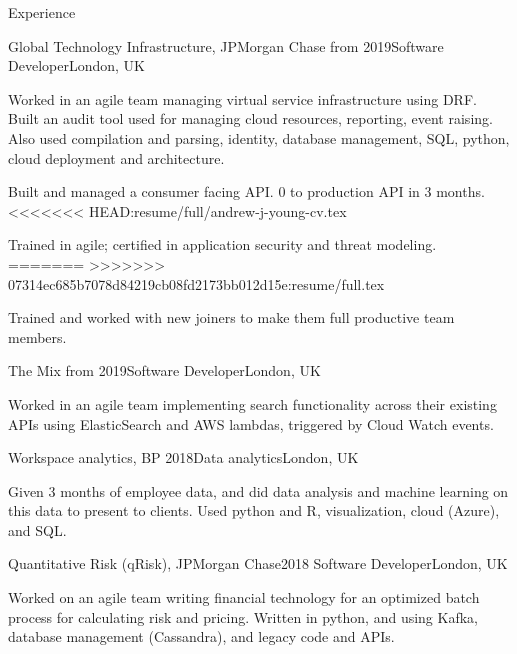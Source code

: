 \documentclass[10pt]{resume} %
\begin{document}
\begin{rSection}{Experience}


  \begin{rSubsection}{Global Technology Infrastructure, JPMorgan Chase}
    {from 2019}{Software Developer}{London, UK}
  \item Worked in an agile team managing virtual service infrastructure using
    DRF. Built an audit tool used for managing cloud resources, reporting, event
    raising. Also used compilation and parsing, identity, database management,
    SQL, python, cloud deployment and architecture.
  \item Built and managed a consumer facing API. 0 to production API in 3 months.
<<<<<<< HEAD:resume/full/andrew-j-young-cv.tex
  \item Trained in agile; certified in application security and threat modeling.
=======
>>>>>>> 07314ec685b7078d84219cb08fd2173bb012d15e:resume/full.tex
  \item Trained and worked with new joiners to make them full productive team
    members.
  \end{rSubsection}


  \begin{rSubsection}{The Mix}
    {from 2019}{Software Developer}{London, UK}
  \item Worked in an agile team implementing search functionality across their
    existing APIs using ElasticSearch and AWS lambdas, triggered by Cloud Watch
    events.
  \end{rSubsection}


  \begin{rSubsection}{Workspace analytics, BP}
    {2018}{Data analytics}{London, UK}
  \item Given 3 months of employee data, and did data analysis and machine
    learning on this data to present to clients. Used python and R,
    visualization, cloud (Azure), and SQL.
  \end{rSubsection}


  \begin{rSubsection}{Quantitative Risk (qRisk), JPMorgan Chase}{2018}
    {Software Developer}{London, UK}
    \item Worked on an agile team writing financial technology for an optimized
      batch process for calculating risk and pricing. Written in python, and
      using Kafka, database management (Cassandra), and legacy code and APIs.
  \end{rSubsection}


\end{rSection}
\end{document}
